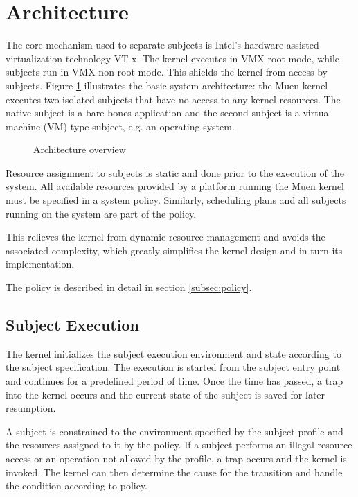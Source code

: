\section{Architecture}\label{sec:architecture}
The core mechanism used to separate subjects is Intel's hardware-assisted
virtualization technology VT-x. The kernel executes in VMX root mode, while
subjects run in VMX non-root mode. This shields the kernel from access by
subjects. Figure \ref{fig:architecture-overview} illustrates the basic system
architecture: the Muen kernel executes two isolated subjects that have no
access to any kernel resources. The native subject is a bare bones application
and the second subject is a virtual machine (VM) type subject, e.g. an
operating system.

\begin{figure}[h]
	\centering
	
	\caption{Architecture overview}
	\label{fig:architecture-overview}
\end{figure}

Resource assignment to subjects is static and done prior to the execution of
the system. All available resources provided by a platform running the Muen
kernel must be specified in a system policy. Similarly, scheduling plans and
all subjects running on the system are part of the policy.

This relieves the kernel from dynamic resource management and avoids the
associated complexity, which greatly simplifies the kernel design and in turn
its implementation.

The policy is described in detail in section \ref{subsec:policy}.

\subsection{Subject Execution}
The kernel initializes the subject execution environment and state according to
the subject specification. The execution is started from the subject entry
point and continues for a predefined period of time. Once the time has passed,
a trap into the kernel occurs and the current state of the subject is saved for
later resumption.

A subject is constrained to the environment specified by the subject profile
and the resources assigned to it by the policy. If a subject performs an
illegal resource access or an operation not allowed by the profile, a trap
occurs and the kernel is invoked. The kernel can then determine the cause for
the transition and handle the condition according to policy.

